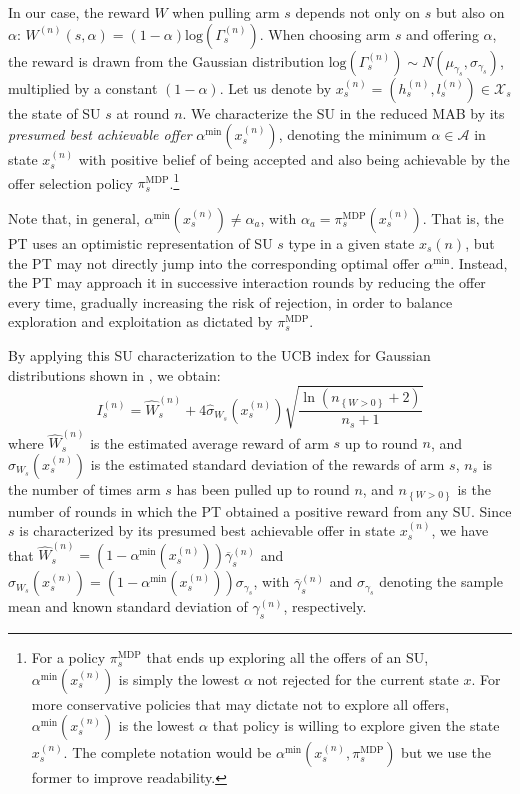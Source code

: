 In our case, the reward $W$ when pulling arm $s$ depends not only on $s$ but also on $\alpha$: $W^{(n)}(s,\alpha) = (1-\alpha)\text{log}(\Gamma_s^{(n)})$. When choosing arm $s$ and offering $\alpha$, the reward is drawn from the Gaussian distribution $\text{log}(\Gamma_s^{(n)}) \sim N(\mu_{\gamma_s},\sigma_{\gamma_s})$, multiplied by a constant $(1-\alpha)$. 
Let us denote by $x_s^{(n)}=(h_s^{(n)},l_s^{(n)}) \in \mathcal{X}_s$ the state of SU $s$ at round $n$.
We characterize the SU in the reduced MAB by its \textit{presumed best achievable offer} $\alpha^{\text{min}}(x_s^{(n)})$, denoting the minimum $\alpha \in \mathcal{A}$ in state $x_s^{(n)}$ with positive belief of being accepted and also being achievable by the offer selection policy $\pi_s^{\text{MDP}}$.\footnote{For a policy $\pi_s^{\text{MDP}}$ that ends up exploring all the offers of an SU, $\alpha^{\text{min}}(x_s^{(n)})$ is simply the lowest $\alpha$ not rejected for the current state $x$. For more conservative policies that may dictate not to explore all offers, $\alpha^{\text{min}}(x_s^{(n)})$ is the lowest $\alpha$ that policy is willing to explore given the state $x_s^{(n)}$. The complete notation would be $\alpha^{\text{min}}(x_s^{(n)},\pi_s^{\text{MDP}})$ but we use the former to improve readability.} 

Note that, in general, $\alpha^{\text{min}}(x_s^{(n)}) \neq \alpha_a$, with $\alpha_a = \pi_s^{\text{MDP}}(x_s^{(n)})$. That is, the PT uses an optimistic representation of SU $s$ type in a given state $x_s{(n)}$, but the PT may not directly jump into the corresponding optimal offer $\alpha^{\text{min}}$. Instead, the PT may approach it in successive interaction rounds by reducing the offer every time, gradually increasing the risk of rejection, in order to balance exploration and exploitation as dictated by $\pi_s^{\text{MDP}}$.

By applying this SU characterization to the UCB index for Gaussian distributions shown in \cite{ref:Auer2002}, we obtain:
\begin{equation}\label{eq:index}
I_{s}^{(n)} = \widehat{W}^{(n)}_s + 4 \hat\sigma_{W_{s}}(x_s^{(n)})\sqrt{\frac{\ln(n_{\left\{W>0\right\}} + 2)}{n_s+1}}
\end{equation}
where $\widehat{W}^{(n)}_s$ is the estimated average reward of arm $s$ up to round $n$, and $\hat\sigma_{W_{s}}(x_s^{(n)})$ is the estimated standard deviation of the rewards of arm $s$, $n_s$ is the number of times arm $s$ has been pulled up to round $n$, and $n_{\left\{W>0\right\}} $ is the number of rounds in which the PT obtained a positive reward from any SU. Since $s$ is characterized by its presumed best achievable offer in state $x_s^{(n)}$, we have that $\widehat{W}_s^{(n)} = (1-\alpha^{\text{min}}(x_s^{(n)}))\overline\gamma_s^{(n)}$ and $\hat\sigma_{W_s}(x_s^{(n)}) = (1-\alpha^{\text{min}}(x_s^{(n)}))\sigma_{\gamma_s}$, with $\overline\gamma_s^{(n)}$ and $\sigma_{\gamma_s}$ denoting the sample mean and known standard deviation of $\gamma_s^{(n)}$, respectively.

